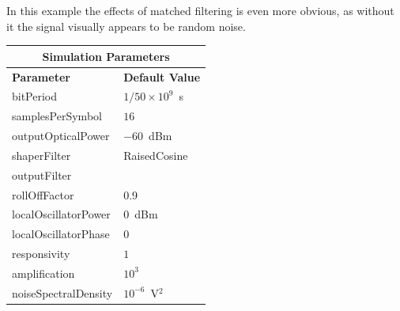 In this example the effects of matched filtering is even more obvious, as
without it the signal visually appears to be random noise.
\begin{table}[H]
	\centering
	\footnotesize
	\begin{tabular}{|l|l|}
		\hline
		\multicolumn{2}{|c|}{ \textbf{Simulation Parameters} } \\
		\hline
		\textbf{Parameter}     & \textbf{Default Value}                                     \\\hline
		bitPeriod              & $1/50\times10^9$~s														\\\hline
		samplesPerSymbol       & $16$                                                       \\\hline
		outputOpticalPower     & $-60$~dBm 													\\ \hline
		shaperFilter	       & RaisedCosine												\\ \hline
		outputFilter		   &                												\\ \hline
		rollOffFactor		   & 0.9														\\ \hline
		localOscillatorPower   & $0$~dBm                                                    \\ \hline
		localOscillatorPhase   & $0$                                                        \\ \hline
		responsivity           & $1$                                                        \\ \hline
		amplification          & $10^3$                                                     \\ \hline
		noiseSpectralDensity   & $10^{-6}$~V$^2$                             					\\ \hline
	\end{tabular}
\end{table}
